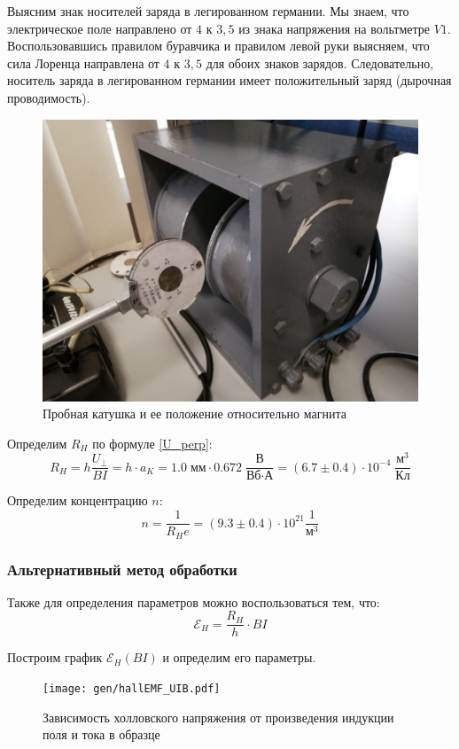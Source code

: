 \documentclass[12pt,a4paper]{article}
\begin{document}
	Выясним знак носителей заряда в легированном германии. Мы знаем, что электрическое поле направлено от $4$ к $3,5$ из знака напряжения на вольтметре $V1$. Воспользовавшись правилом буравчика и правилом левой руки выясняем, что сила Лоренца направлена от $4$ к $3,5$ для обоих знаков зарядов. Следовательно, носитель заряда в легированном германии имеет положительный заряд (дырочная проводимость).
	
	\begin{figure}[H]
		\includegraphics[scale = 0.25]{res/probe_coil.jpg}
		\caption{Пробная катушка и ее положение относительно магнита}
	\end{figure}
	
	Определим $R_H$ по формуле \eqref{U_perp}:
	$$ R_H = h \frac{U_\perp}{BI} = h \cdot a_K = 1.0 \; \text{мм} \cdot 0.672 \; \frac{\text{В}}{\text{Вб} \cdot \text{А}} = (6.7 \pm 0.4) \cdot 10^{-4} \; \frac{\text{м}^3}{\text{Кл}} $$
	
	Определим концентрацию $n$:
	$$ n = \frac{1}{R_H e} = (9.3 \pm 0.4) \cdot 10^{21} \frac{1}{\text{м}^3} $$
	
	\subsubsection*{Альтернативный метод обработки}
	
	Также для определения параметров можно воспользоваться тем, что:
	$$ \mathcal{E}_H = \frac{R_H}{h} \cdot BI $$
	
	Построим график $\mathcal{E}_H (BI)$ и определим его параметры.
	
	\begin{figure}[H]
		\texttt{[image: gen/hallEMF\_UIB.pdf]}
		\caption{Зависимость холловского напряжения от произведения индукции поля и тока в образце}
	\end{figure}
	
\end{document}
